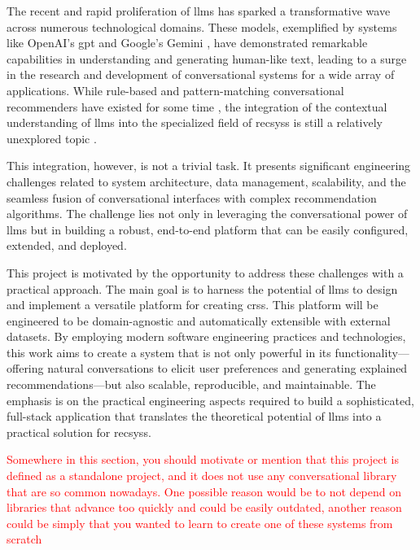 The recent and rapid proliferation of \acp{llm} has sparked a transformative wave across numerous technological domains. These models, exemplified by systems like OpenAI's \ac{gpt} \cite{CHATGPT} and Google's Gemini \cite{GEMINI}, have demonstrated remarkable capabilities in understanding and generating human-like text, leading to a surge in the research and development of conversational systems for a wide array of applications. While rule-based and pattern-matching conversational recommenders have existed for some time \cite{SOTA-CRS}, the integration of the contextual understanding of \acp{llm} into the specialized field of \acl{recsys}s is still a relatively unexplored topic \cite{SOTA-CRS-LLM}.

This integration, however, is not a trivial task. It presents significant engineering challenges related to system architecture, data management, scalability, and the seamless fusion of conversational interfaces with complex recommendation algorithms. The challenge lies not only in leveraging the conversational power of \acp{llm} but in building a robust, end-to-end platform that can be easily configured, extended, and deployed.

This project is motivated by the opportunity to address these challenges with a practical approach. The main goal is to harness the potential of \acp{llm} to design and implement a versatile platform for creating \acp{crs}. This platform will be engineered to be domain-agnostic and automatically extensible with external datasets. By employing modern software engineering practices and technologies, this work aims to create a system that is not only powerful in its functionality---offering natural conversations to elicit user preferences \cite[Conversational Preference Elicitation]{CHAPTER:RS-HANDBOOK-NLP} and generating explained recommendations---but also scalable, reproducible, and maintainable. The emphasis is on the practical engineering aspects required to build a sophisticated, full-stack application that translates the theoretical potential of \acp{llm} into a practical solution for \acl{recsys}s.

\textcolor{red}{Somewhere in this section, you should motivate or mention that this project is defined as a standalone project, and it does not use any conversational library that are so common nowadays. One possible reason would be to not depend on libraries that advance too quickly and could be easily outdated, another reason could be simply that you wanted to learn to create one of these systems from scratch}
